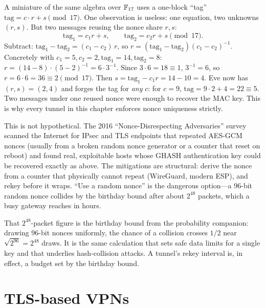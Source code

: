 \begin{intuitionbox}
A miniature of the same algebra over \(\mathbb{F}_{17}\) uses a one-block ``tag'' \( \mathrm{tag} = c\cdot r + s \pmod{17}\). One observation is useless: one equation, two unknowns \((r,s)\). But two messages reusing the nonce share \(r,s\):
\[
\mathrm{tag}_1 = c_1 r + s,\qquad \mathrm{tag}_2 = c_2 r + s \pmod{17}.
\]
Subtract: \(\mathrm{tag}_1-\mathrm{tag}_2 = (c_1-c_2)\,r\), so \(r = (\mathrm{tag}_1-\mathrm{tag}_2)(c_1-c_2)^{-1}\). Concretely with \(c_1=5, c_2=2, \mathrm{tag}_1=14, \mathrm{tag}_2=8\): \(r = (14-8)\cdot(5-2)^{-1} = 6\cdot 3^{-1}\). Since \(3\cdot 6 = 18 \equiv 1\), \(3^{-1}=6\), so \(r = 6\cdot 6 = 36 \equiv 2 \pmod{17}\). Then \(s = \mathrm{tag}_1 - c_1 r = 14 - 10 = 4\). Eve now has \((r,s)=(2,4)\) and forges the tag for \emph{any} \(c\): for \(c=9\), \(\mathrm{tag}=9\cdot 2 + 4 = 22 \equiv 5\). Two messages under one reused nonce were enough to recover the MAC key. This is why every tunnel in this chapter enforces nonce uniqueness strictly.
\end{intuitionbox}

\begin{attackbox}
This is not hypothetical. The 2016 ``Nonce-Disrespecting Adversaries'' survey scanned the Internet for IPsec and TLS endpoints that repeated AES-GCM nonces (usually from a broken random nonce generator or a counter that reset on reboot) and found real, exploitable hosts whose GHASH authentication key could be recovered exactly as above. The mitigations are structural: derive the nonce from a counter that physically cannot repeat (WireGuard, modern ESP), and rekey before it wraps. ``Use a random nonce'' is the dangerous option---a 96-bit random nonce collides by the birthday bound after about \(2^{48}\) packets, which a busy gateway reaches in hours.
\end{attackbox}

\begin{connectionbox}
That \(2^{48}\)-packet figure is the birthday bound from the probability companion: drawing 96-bit nonces uniformly, the chance of a collision crosses \(1/2\) near \(\sqrt{2^{96}} = 2^{48}\) draws. It is the same calculation that sets safe data limits for a single key and that underlies hash-collision attacks. A tunnel's rekey interval is, in effect, a budget set by the birthday bound.
\end{connectionbox}

\section{TLS-based VPNs}
\label{ch30:tlsvpn}

